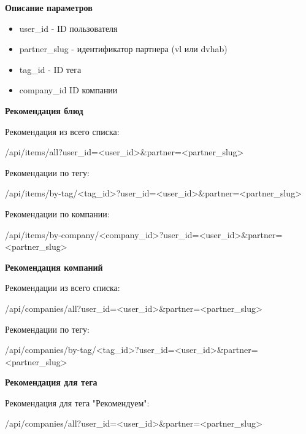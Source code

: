 \textbf{Описание параметров}
\begin{itemize}
  \item user\_id - ID пользователя
  \item partner\_slug - идентификатор партнера (vl или dvhab)
  \item tag\_id - ID тега
  \item company\_id ID компании
\end{itemize}

\textbf{Рекомендация блюд}

Рекомендация из всего списка:

/api/items/all?user\_id=<user\_id>\&partner=<partner\_slug>

Рекомендации по тегу:

/api/items/by-tag/<tag\_id>?user\_id=<user\_id>\&partner=<partner\_slug>

Рекомендации по компании:

/api/items/by-company/<company\_id>?user\_id=<user\_id>\&partner=<partner\_slug>

\textbf{Рекомендация компаний}

Рекомендации из всего списка:

/api/companies/all?user\_id=<user\_id>\&partner=<partner\_slug>

Рекомендации по тегу:

/api/companies/by-tag/<tag\_id>?user\_id=<user\_id>\&partner=<partner\_slug>

\textbf{Рекомендация для тега}

Рекомендация для тега "Рекомендуем":

/api/companies/all?user\_id=<user\_id>\&partner=<partner\_slug>
